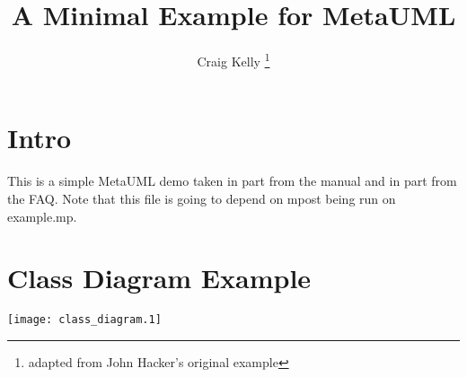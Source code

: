 \documentclass[letterpaper,10pt]{article}
\title{A Minimal Example for MetaUML}
\author{Craig Kelly \footnote{adapted from John Hacker's original example} }
\begin{document}
\maketitle

\section{Intro}

This is a simple MetaUML demo taken in part from the manual and in
part from the FAQ.  Note that this file is going to depend on mpost
being run on example.mp.

\section{Class Diagram Example}

\texttt{[image: class\_diagram.1]}
\end{document}
